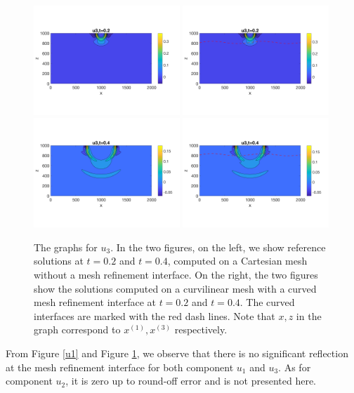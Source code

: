\begin{figure}[htbp]
	\centering
	\includegraphics[width=0.49\textwidth,trim={0 2.8cm 0 2.8cm}, clip]{u3_t02_cartesian.png}
	\includegraphics[width=0.49\textwidth,trim={0 2.8cm 0 2.8cm}, clip]{u3_t02_curvi_mr.png}\\
	\includegraphics[width=0.49\textwidth,trim={0 2.8cm 0 2.8cm}, clip]{u3_t04_cartesian.png}
	\includegraphics[width=0.49\textwidth,trim={0 2.8cm 0 2.8cm}, clip]{u3_t04_curvi_mr.png}
	\caption{The graphs for $u_3$. In the two figures, on the left, we show reference solutions at $t=0.2$ and $t=0.4$, computed on a Cartesian mesh without a mesh refinement interface. On the right, the two figures show the solutions computed on a curvilinear mesh with a curved mesh refinement interface at $t=0.2$ and $t=0.4$. The curved interfaces are marked with the red dash lines. Note that $x,z$ in the graph correspond to $x^{(1)}, x^{(3)}$ respectively.}
\label{u3}
\end{figure}
From Figure \ref{u1} and Figure \ref{u3}, we observe that there is no significant reflection at the mesh refinement interface for both component $u_1$ and $u_3$. As for component $u_2$, it is zero up to round-off error and is not presented here.
